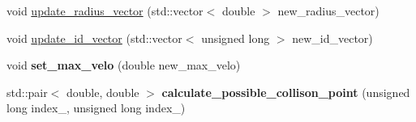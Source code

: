 \begin{DoxyCompactItemize}
\item 
void \hyperlink{classParticle_a302b498f288a8bd367f0ed6c45dfdc27}{update\+\_\+radius\+\_\+vector} (std\+::vector$<$ double $>$ new\+\_\+radius\+\_\+vector)
\item 
void \hyperlink{classParticle_a7094fdedac6a745846bfd2dc028907f9}{update\+\_\+id\+\_\+vector} (std\+::vector$<$ unsigned long $>$ new\+\_\+id\+\_\+vector)
\item 
\hypertarget{classParticle_aec9f3d1848cf9adc13f6ee75c0bded7b}{}void {\bfseries set\+\_\+max\+\_\+velo} (double new\+\_\+max\+\_\+velo)\label{classParticle_aec9f3d1848cf9adc13f6ee75c0bded7b}

\item 
\hypertarget{classParticle_af9920f720bfedc0f739b9255bda83f06}{}std\+::pair$<$ double, double $>$ {\bfseries calculate\+\_\+possible\+\_\+collison\+\_\+point} (unsigned long index\+\_, unsigned long index\+\_)\label{classParticle_af9920f720bfedc0f739b9255bda83f06}


\end{DoxyCompactItemize}
